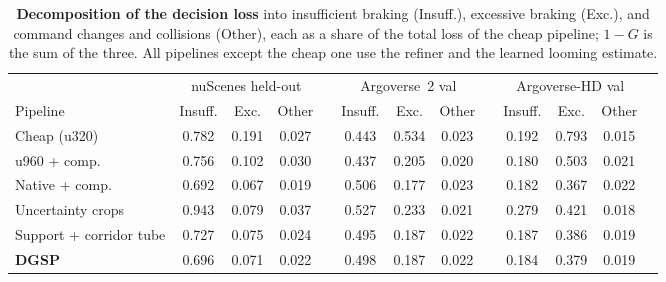 \documentclass[10pt,letterpaper]{article}
\newcommand{\method}{DGSP\xspace}
\newcommand{\G}{G}
\newcommand{\oursrow}{\rowcolor{oursbg}}
\theoremstyle{remark}
\theoremstyle{plain}
\theoremstyle{definition}
\begin{document}
\begin{table}[!tbp]
\centering
\caption{\textbf{Decomposition of the decision loss} into insufficient braking (Insuff.), excessive braking (Exc.), and command changes and collisions (Other), each as a share of the total loss of the cheap pipeline; $1-\G$ is the sum of the three. All pipelines except the cheap one use the refiner and the learned looming estimate.}
\label{tab:loss}
\small
\setlength{\tabcolsep}{3.4pt}
\begin{tabular}{@{}lcccccccccccc@{}}
\toprule
 & \multicolumn{3}{c}{nuScenes held-out} & & \multicolumn{3}{c}{Argoverse~2 val} & & \multicolumn{3}{c}{Argoverse-HD val} \\
\cmidrule(lr){2-4}\cmidrule(lr){6-8}\cmidrule(l){10-12}
Pipeline & Insuff. & Exc. & Other & & Insuff. & Exc. & Other & & Insuff. & Exc. & Other \\
\midrule
Cheap (u320) & 0.782 & 0.191 & 0.027 &  & 0.443 & 0.534 & 0.023 &  & 0.192 & 0.793 & 0.015 \\
u960 + comp. & 0.756 & 0.102 & 0.030 &  & 0.437 & 0.205 & 0.020 &  & 0.180 & 0.503 & 0.021 \\
Native + comp. & 0.692 & 0.067 & 0.019 &  & 0.506 & 0.177 & 0.023 &  & 0.182 & 0.367 & 0.022 \\
Uncertainty crops & 0.943 & 0.079 & 0.037 &  & 0.527 & 0.233 & 0.021 &  & 0.279 & 0.421 & 0.018 \\
Support + corridor tube & 0.727 & 0.075 & 0.024 &  & 0.495 & 0.187 & 0.022 &  & 0.187 & 0.386 & 0.019 \\
\midrule
\oursrow \textbf{\method} & 0.696 & 0.071 & 0.022 &  & 0.498 & 0.187 & 0.022 &  & 0.184 & 0.379 & 0.019 \\
\bottomrule
\end{tabular}
\end{table}
\end{document}
